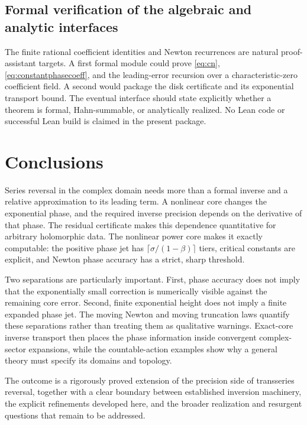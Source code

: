 \documentclass[11pt,a4paper]{article}
\theoremstyle{definition}
\theoremstyle{remark}
\numberwithin{equation}{section}
\begin{document}
\subsection{Formal verification of the algebraic and analytic interfaces}

The finite rational coefficient identities and Newton recurrences are natural proof-assistant targets. A first formal module could prove \eqref{eq:cn}, \eqref{eq:constantphasecoeff}, and the leading-error recursion over a characteristic-zero coefficient field. A second would package the disk certificate and its exponential transport bound. The eventual interface should state explicitly whether a theorem is formal, Hahn-summable, or analytically realized. No Lean code or successful Lean build is claimed in the present package.

\section{Conclusions}\label{sec:conclusion}

Series reversal in the complex domain needs more than a formal inverse and a relative approximation to its leading term. A nonlinear core changes the exponential phase, and the required inverse precision depends on the derivative of that phase. The residual certificate makes this dependence quantitative for arbitrary holomorphic data. The nonlinear power core makes it exactly computable: the positive phase jet has $\lceil\sigma/(1-\beta)\rceil$ tiers, critical constants are explicit, and Newton phase accuracy has a strict, sharp threshold.

Two separations are particularly important. First, phase accuracy does not imply that the exponentially small correction is numerically visible against the remaining core error. Second, finite exponential height does not imply a finite expanded phase jet. The moving Newton and moving truncation laws quantify these separations rather than treating them as qualitative warnings. Exact-core inverse transport then places the phase information inside convergent complex-sector expansions, while the countable-action examples show why a general theory must specify its domains and topology.

The outcome is a rigorously proved extension of the precision side of transseries reversal, together with a clear boundary between established inversion machinery, the explicit refinements developed here, and the broader realization and resurgent questions that remain to be addressed.
\end{document}
